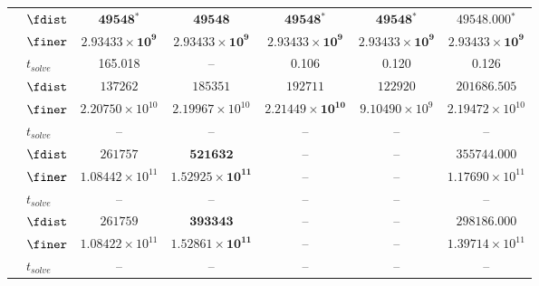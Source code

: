 \begin{table}[!b]
\begin{tabular}{llccccc}
		 & $\fdist$ & $\mathbf{49548{}^*}$ & $\mathbf{49548}$ & $\mathbf{49548{}^*}$ & $\mathbf{49548{}^*}$ & $\mathbf{49548.000{}^*}$ \\
        & $\finer$ & $\mathbf{2.93433\times 10^{9}}$ & $\mathbf{2.93433\times 10^{9}}$ & $\mathbf{2.93433\times 10^{9}}$ & $\mathbf{2.93433\times 10^{9}}$ & $\mathbf{2.93433\times 10^{9}}$ \\
		& $t_{solve}$ & 165.018 & -- & 0.106 & 0.120 & 0.126 \\
		\midrule

		 & $\fdist$ & $137262$ & $185351$ & $192711$ & $122920$ & $\mathbf{201686.505}$ \\
        & $\finer$ & $2.20750\times 10^{10}$ & $2.19967\times 10^{10}$ & $\mathbf{2.21449\times 10^{10}}$ & $9.10490\times 10^{9}$ & $2.19472\times 10^{10}$ \\
		& $t_{solve}$ & -- & -- & -- & -- & -- \\
		\midrule

		 & $\fdist$ & $261757$ & $\mathbf{521632}$ & -- & -- & $355744.000$ \\
        & $\finer$ & $1.08442\times 10^{11}$ & $\mathbf{1.52925\times 10^{11}}$ & -- & -- & $1.17690\times 10^{11}$ \\
		& $t_{solve}$ & -- & -- & -- & -- & -- \\
		\midrule

		 & $\fdist$ & $261759$ & $\mathbf{393343}$ & -- & -- & $298186.000$ \\
        & $\finer$ & $1.08422\times 10^{11}$ & $\mathbf{1.52861\times 10^{11}}$ & -- & -- & $1.39714\times 10^{11}$ \\
		& $t_{solve}$ & -- & -- & -- & -- & -- \\

		\bottomrule
	\end{tabular}
\end{table}